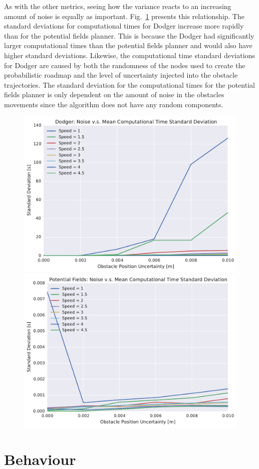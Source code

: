 As with the other metrics, seeing how the variance reacts to an increasing
amount of noise is equally as important. Fig.~\ref{fig:plot_std_comp_time}
presents this relationship. The standard deviations for computational times for
Dodger increase more rapidly than for the potential fields planner. This is
because the Dodger had significantly larger computational times than the
potential fields planner and would also have higher standard deviations.
Likewise, the computational time standard deviations for Dodger are caused by
both the randomness of the nodes used to create the probabilistic roadmap and
the level of uncertainty injected into the obstacle trajectories. The standard
deviation for the computational times for the potential fields planner is only
dependent on the amount of noise in the obstacles movements since the algorithm
does not have any random components.

\begin{figure}[h!]
    \centering
    \includegraphics[width=0.48\linewidth]{figs/planner_std_avg_times_0}
    \includegraphics[width=0.48\linewidth]{figs/pf_std_avg_times_0}
    \caption{}
    \label{fig:plot_std_comp_time}
\end{figure}

\section{Behaviour}

